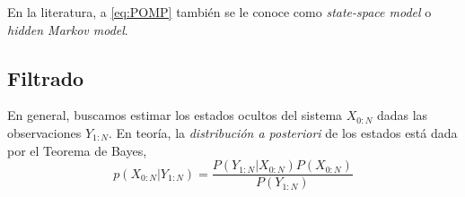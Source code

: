 En la literatura, a \ref{eq:POMP} también se le conoce como \textit{state-space model} o \textit{hidden Markov model}.

\subsection{Filtrado}

En general, buscamos estimar los estados ocultos del sistema $X_{0:N}$ dadas las observaciones $Y_{1:N}$. En teoría, la \textit{distribución a posteriori} de los estados está dada por el Teorema de Bayes,
\begin{equation}
    p(X_{0:N}|Y_{1:N}) = \frac{P(Y_{1:N}|X_{0:N})P(X_{0:N})}{P(Y_{1:N})}
\end{equation}


